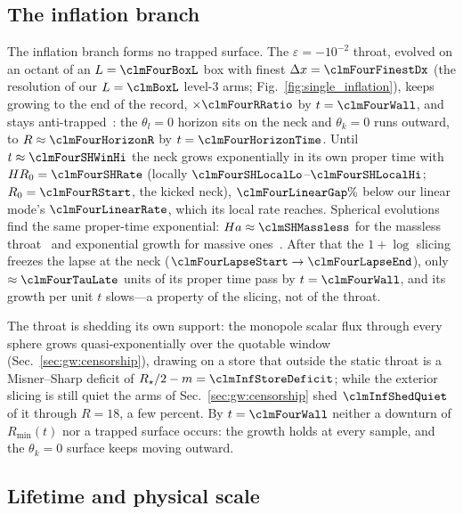 \documentclass[twocolumn,floatfix,aps,prd,superscriptaddress,nofootinbib]{revtex4-2}
\begin{document}
\subsection{The inflation branch}
\label{sec:single:fate}

The inflation branch forms no trapped surface. The $\varepsilon=-10^{-2}$ throat, evolved on an octant of an $L=\clmFourBoxL$ box with finest $\Delta x=\clmFourFinestDx$ (the resolution of our $L=\clmBoxL$ level-3 arms; Fig.~\ref{fig:single_inflation}), keeps growing to the end of the record, $\times\clmFourRRatio$ by $t=\clmFourWall$, and stays anti-trapped~\cite{hayward1999}: the $\theta_l=0$ horizon sits on the neck and $\theta_k=0$ runs outward, to $R\approx\clmFourHorizonR$ by $t=\clmFourHorizonTime$. Until $t\approx\clmFourSHWinHi$ the neck grows exponentially in its own proper time with $HR_0=\clmFourSHRate$ (locally $\clmFourSHLocalLo$--$\clmFourSHLocalHi$; $R_0=\clmFourRStart$, the kicked neck), $\clmFourLinearGap\%$ below our linear mode's $\clmFourLinearRate$, which its local rate reaches. Spherical evolutions find the same proper-time exponential: $Ha\approx\clmSHMassless$ for the massless throat~\cite{shinkai2002} and exponential growth for massive ones~\cite{gonzalez2009}. After that the $1{+}\log$ slicing freezes the lapse at the neck ($\clmFourLapseStart\to\clmFourLapseEnd$), only $\approx\clmFourTauLate$ units of its proper time pass by $t=\clmFourWall$, and its growth per unit $t$ slows---a property of the slicing, not of the throat.

The throat is shedding its own support: the monopole scalar flux through every sphere grows quasi-exponentially over the quotable window (Sec.~\ref{sec:gw:censorship}), drawing on a store that outside the static throat is a Misner--Sharp deficit of $R_\star/2-m=\clmInfStoreDeficit$; while the exterior slicing is still quiet the arms of Sec.~\ref{sec:gw:censorship} shed $\clmInfShedQuiet$ of it through $R=18$, a few percent. By $t=\clmFourWall$ neither a downturn of $R_{\min}(t)$ nor a trapped surface occurs: the growth holds at every sample, and the $\theta_k=0$ surface keeps moving outward.

\subsection{Lifetime and physical scale}
\label{sec:single:lifetime}
\end{document}
